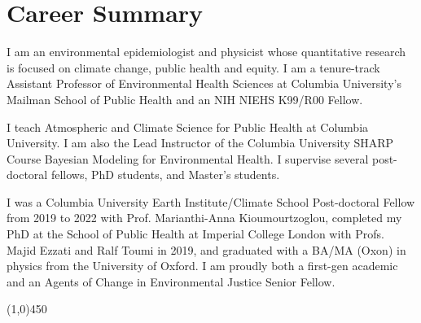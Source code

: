 \section*{Career Summary}

I am an environmental epidemiologist and physicist whose quantitative research is focused on climate change, public health and equity. I am a tenure-track Assistant Professor of Environmental Health Sciences at Columbia University's Mailman School of Public Health and an NIH NIEHS K99/R00 Fellow. 

\noindent I teach Atmospheric and Climate Science for Public Health at Columbia University. I am also the Lead Instructor of the Columbia University SHARP Course Bayesian Modeling for Environmental Health. I supervise several post-doctoral fellows, PhD students, and Master's students.\smallskip

\noindent I was a Columbia University Earth Institute/Climate School Post-doctoral Fellow from 2019 to 2022 with Prof. Marianthi-Anna Kioumourtzoglou, completed my PhD at the School of Public Health at Imperial College London with Profs. Majid Ezzati and Ralf Toumi in 2019, and graduated with a BA/MA (Oxon) in physics from the University of Oxford. I am proudly both a first-gen academic and an Agents of Change in Environmental Justice Senior Fellow.

\begin{center} \line(1,0){450} \end{center}